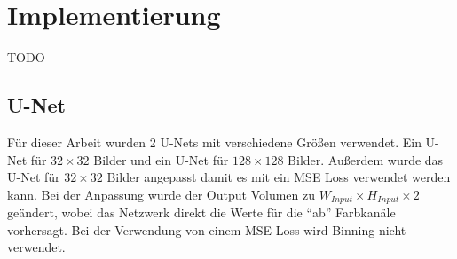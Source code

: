 \chapter{Implementierung}

TODO
\section{U-Net}
Für dieser Arbeit wurden 2 U-Nets mit verschiedene Größen verwendet. Ein U-Net für $ 32 \times 32 $ Bilder und ein U-Net für $ 128 \times 128 $ 
Bilder. Außerdem wurde das U-Net für $ 32 \times 32 $ Bilder angepasst damit es mit ein MSE Loss verwendet werden kann. Bei der Anpassung wurde
der Output Volumen zu $ W_{Input} \times H_{Input} \times 2 $ geändert, wobei das Netzwerk direkt die Werte für die ``ab'' Farbkanäle vorhersagt.
Bei der Verwendung von einem MSE Loss wird Binning nicht verwendet.

